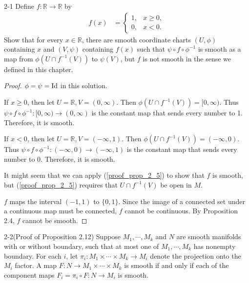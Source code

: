 \begin{customprob}{2-1}
  Define $f: \mathbb{R} \rightarrow \mathbb{R}$ by
  \begin{align*}
    f(x) &= \begin{cases}
      1, & x \geq 0, \\
      0, & x < 0.
    \end{cases}
  \end{align*}
  Show that for every $x \in \mathbb{R}$, there are smooth coordinate charts $(U, \phi)$ containing $x$ and $(V, \psi)$ containing $f(x)$ such that $\psi \circ f \circ \phi^{-1}$ is smooth as a map from $\phi(U \cap f^{-1}(V))$ to $\psi(V)$, but $f$ is not smooth in the sense we defined in this chapter.
\end{customprob}

\begin{proof}
  $\phi = \psi = \operatorname{Id}$ in this solution.

  If $x \geq 0$, then let $U = \mathbb{R}, V = (0, \infty)$.
  Then $\phi(U \cap f^{-1}(V)) = [0, \infty)$.
  Thus $\psi \circ f \circ \phi^{-1}: [0, \infty) \rightarrow (0, \infty)$ is the constant map that sends every number to 1.
  Therefore, it is smooth.

  If $x < 0$, then let $U = \mathbb{R}, V = (-\infty, 1)$.
  Then $\phi(U \cap f^{-1}(V)) = (-\infty, 0)$.
  Thus $\psi \circ f \circ \phi^{-1}: (-\infty, 0) \rightarrow (-\infty, 1)$ is the constant map that sends every number to 0.
  Therefore, it is smooth.

  It might seem that we can apply (\ref{proof_prop_2_5}) to show that $f$ is smooth, but (\ref{proof_prop_2_5}) requires that $U \cap f^{-1}(V)$ be open in $M$.

  $f$ maps the interval $(-1, 1)$ to $\{ 0, 1 \}$.
  Since the image of a connected set under a continuous map must be connected, $f$ cannot be continuous.
  By Proposition 2.4, $f$ cannot be smooth.
\end{proof}

\begin{customprob}{2-2(Proof of Proposition 2.12)}\label{problem_2_2}
  Suppose $M_1, \cdots, M_k$ and $N$ are smooth manifolds with or without boundary, such that at most one of $M_1, \cdots, M_k$ has nonempty boundary.
  For each $i$, let $\pi_i: M_1 \times \cdots \times M_k \rightarrow M_i$ denote the projection onto the $M_i$ factor.
  A map $F: N \rightarrow M_1 \times \cdots \times M_k$ is smooth if and only if each of the component maps $F_i = \pi_i \circ F: N \rightarrow M_i$ is smooth.
\end{customprob}

